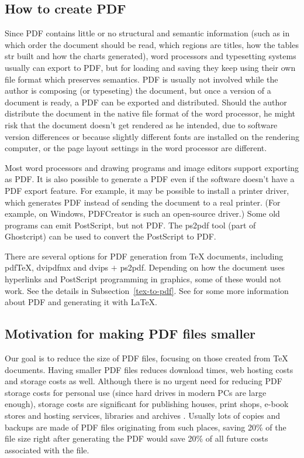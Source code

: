 \documentclass{ltugproc}
\def\cmd{\textsf}
\begin{document}
\subsection{How to create PDF}

Since PDF contains little or no structural and semantic information (such as
in which order the document should be read, which regions are titles, how
the tables str built and how the charts generated), word processors and
typesetting systems usually can export to PDF, but for loading and saving
they keep using their own
file format which preserves semantics. PDF is usually not involved while the
author is composing (or typeseting) the document, but once a version of a
document is ready, a PDF can be exported and distributed. Should the author
distribute the document in the native file format of the word processor, he
might risk that the document doesn't get rendered as he intended, due to
software version differences or because slightly different fonts are
installed on the rendering computer, or the page layout settings in the word
processor are different.

Most word processors and drawing programs and image editors support
exporting as PDF. It is also possible to generate a PDF even if the software
doesn't have a PDF export feature. For example, it may be possible to
install a printer driver, which generates PDF instead of sending the
document to a real printer. (For example, on Windows, PDFCreator
\cite{pdfcreator} is such an open-source driver.) Some old programs can emit
PostScript, but not PDF. The \cmd{ps2pdf} \cite{ps2df} tool (part of
Ghostcript) can be used to convert the PostScript to PDF.

There are several options for PDF generation from
\TeX{} documents, including
pdf\TeX{}, \cmd{dvipdfmx} and \cmd{dvips} $+$ \cmd{ps2pdf}. Depending on how
the document uses hyperlinks and PostScript programming in graphics, some of
these would not work. See the details in Subsection~\ref{tex-to-pdf}. See
\cite{creative-pdf} for
some more information about PDF and generating it with \LaTeX{}.

\subsection{Motivation for making PDF files smaller}

Our goal is to reduce the size of PDF files, focusing on those
created from \TeX{} documents. Having smaller PDF files reduces download
times, web hosting costs and storage costs as well. Although there is no
urgent need for reducing PDF storage costs for personal use (since hard
drives in modern PCs are large enough), storage costs are significant for
publishing houses, print shops, e-book stores and hosting services,
libraries and archives \cite{multivalent-article}.
Usually lots of copies and backups are made of PDF
files originating from such places, saving 20\% of the file size right after
generating the PDF would save 20\% of all future costs associated with the
file.
\end{document}
